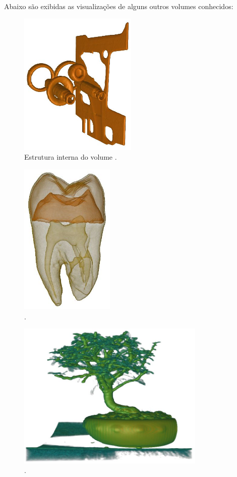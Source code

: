 	Abaixo são exibidas as visualizações de alguns outros volumes conhecidos:
	
\begin{figure}[H]
	\centering
	\includegraphics[width=0.5\textwidth]{images/r_m_engine_iso}
	\caption{Estrutura interna do volume .}
\end{figure}

\begin{figure}[H]
	\centering
	\includegraphics[width=0.4\textwidth]{images/r_m_tooth}
	\caption{.}
\end{figure}

\begin{figure}[H]
	\centering
	\includegraphics[width=0.8\textwidth]{images/r_m_bonsai}
	\caption{.}
\end{figure}

